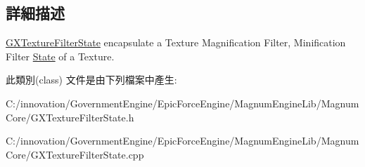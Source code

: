 \subsection{詳細描述}
\hyperlink{class_i_dream_sky_1_1_g_x_texture_filter_state}{G\+X\+Texture\+Filter\+State} encapsulate a Texture Magnification Filter, Minification Filter \hyperlink{class_i_dream_sky_1_1_state}{State} of a Texture. 

此類別(class) 文件是由下列檔案中產生\+:\begin{DoxyCompactItemize}
\item 
C\+:/innovation/\+Government\+Engine/\+Epic\+Force\+Engine/\+Magnum\+Engine\+Lib/\+Magnum\+Core/G\+X\+Texture\+Filter\+State.\+h\item 
C\+:/innovation/\+Government\+Engine/\+Epic\+Force\+Engine/\+Magnum\+Engine\+Lib/\+Magnum\+Core/G\+X\+Texture\+Filter\+State.\+cpp\end{DoxyCompactItemize}
